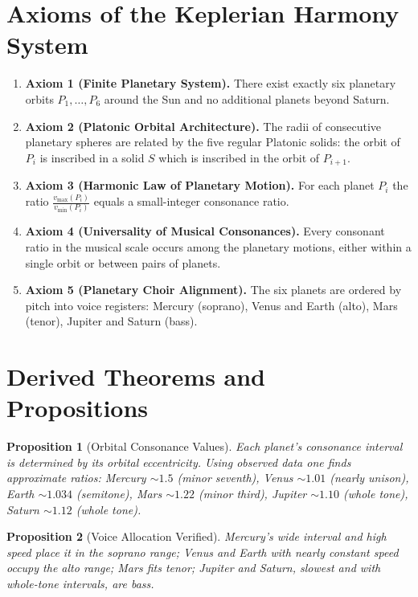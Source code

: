 \documentclass[11pt]{article}
\newtheorem{proposition}{Proposition}
\begin{document}
\section*{Axioms of the Keplerian Harmony System}
\begin{enumerate}
  \item \textbf{Axiom 1 (Finite Planetary System).} There exist exactly six planetary orbits $P_1,\ldots,P_6$ around the Sun and no additional planets beyond Saturn.
  \item \textbf{Axiom 2 (Platonic Orbital Architecture).} The radii of consecutive planetary spheres are related by the five regular Platonic solids: the orbit of $P_i$ is inscribed in a solid $S$ which is inscribed in the orbit of $P_{i+1}$.
  \item \textbf{Axiom 3 (Harmonic Law of Planetary Motion).} For each planet $P_i$ the ratio $\tfrac{v_{\max}(P_i)}{v_{\min}(P_i)}$ equals a small-integer consonance ratio.
  \item \textbf{Axiom 4 (Universality of Musical Consonances).} Every consonant ratio in the musical scale occurs among the planetary motions, either within a single orbit or between pairs of planets.
  \item \textbf{Axiom 5 (Planetary Choir Alignment).} The six planets are ordered by pitch into voice registers: Mercury (soprano), Venus and Earth (alto), Mars (tenor), Jupiter and Saturn (bass).
\end{enumerate}

\section*{Derived Theorems and Propositions}
\begin{proposition}[Orbital Consonance Values]
Each planet's consonance interval is determined by its orbital eccentricity.  Using observed data one finds approximate ratios:\newline
Mercury $\sim1.5$ (minor seventh), Venus $\sim1.01$ (nearly unison), Earth $\sim1.034$ (semitone), Mars $\sim1.22$ (minor third), Jupiter $\sim1.10$ (whole tone), Saturn $\sim1.12$ (whole tone).
\end{proposition}

\begin{proposition}[Voice Allocation Verified]
Mercury's wide interval and high speed place it in the soprano range; Venus and Earth with nearly constant speed occupy the alto range; Mars fits tenor; Jupiter and Saturn, slowest and with whole-tone intervals, are bass.
\end{proposition}
\end{document}
